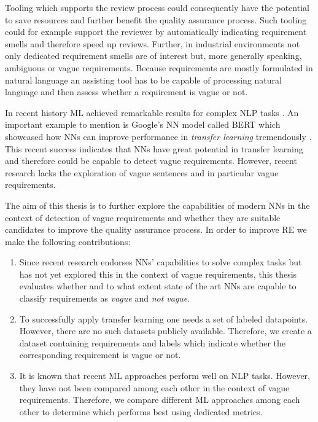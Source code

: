 Tooling which supports the review process could consequently have the potential to save resources and further benefit the quality assurance process.
Such tooling could for example support the reviewer by automatically indicating requirement smells and therefore speed up reviews.
Further, in industrial environments not only dedicated requirement smells are of interest but, more generally speaking, ambiguous or vague requirements.
Because requirements are mostly formulated in natural language \parencite{Mich:2004} an assisting tool has to be capable of processing natural language and then assess whether a requirement is vague or not.

In recent history \Ac{ML} achieved remarkable results for complex \ac{NLP} tasks \parencite{Khan:2016}.
An important example to mention is Google's \ac{NN} model called BERT which showcased how \acp{NN} can improve performance in \textit{transfer learning} tremendously \parencite{Devlin:2018}.
This recent success indicates that \acp{NN} have great potential in transfer learning and therefore could be capable to detect vague requirements.
However, recent research lacks the exploration of vague sentences and in particular vague requirements.

The aim of this thesis is to further explore the capabilities of modern \acp{NN} in the context of detection of vague requirements and whether they are suitable candidates to improve the quality assurance process.
In order to improve \ac{RE} we make the following contributions:
\begin{enumerate}
    \item Since recent research endorses \acp{NN}' capabilities to solve complex tasks but has not yet explored this in the context of vague requirements, this thesis evaluates whether and to what extent state of the art \acp{NN} are capable to classify requirements as \textit{vague} and \textit{not vague}.
    \item To successfully apply transfer learning one needs a set of labeled datapoints. However, there are no such datasets publicly available.
        Therefore, we create a dataset containing requirements and labels which indicate whether the corresponding requirement is vague or not.
    \item It is known that recent \ac{ML} approaches perform well on \ac{NLP} tasks.
        However, they have not been compared among each other in the context of vague requirements.
        Therefore, we compare different \ac{ML} approaches among each other to determine which performs best using dedicated metrics.
\end{enumerate}

